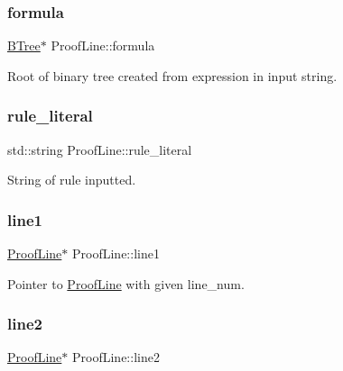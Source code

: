 \mbox{\label{classProofLine_ac9dee0241ef4f6371135098fd5b1a66d}} 
\subsubsection{\texorpdfstring{formula}{formula}}
{\footnotesize\ttfamily \mbox{\hyperlink{classBTree}{B\+Tree}}$\ast$ Proof\+Line\+::formula}



Root of binary tree created from expression in input string. 

\mbox{\label{classProofLine_acdc39e9e092a10ba3a6124f21c0eb420}} 
\subsubsection{\texorpdfstring{rule\+\_\+literal}{rule\_literal}}
{\footnotesize\ttfamily std\+::string Proof\+Line\+::rule\+\_\+literal}



String of rule inputted. 

\mbox{\label{classProofLine_a7dbdcf0ea65aed377c5ac03303b474a6}} 
\subsubsection{\texorpdfstring{line1}{line1}}
{\footnotesize\ttfamily \mbox{\hyperlink{classProofLine}{Proof\+Line}}$\ast$ Proof\+Line\+::line1}



Pointer to \mbox{\hyperlink{classProofLine}{Proof\+Line}} with given line\+\_\+num. 

\mbox{\label{classProofLine_afed6bbbe21b20cdbde9398eb73ccf15f}} 
\subsubsection{\texorpdfstring{line2}{line2}}
{\footnotesize\ttfamily \mbox{\hyperlink{classProofLine}{Proof\+Line}}$\ast$ Proof\+Line\+::line2}



